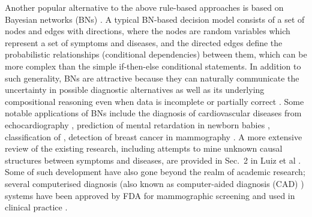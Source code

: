 Another popular alternative to the above rule-based approaches is based on Bayesian networks (BNs) \cite{pearl2014probabilistic}. A typical BN-based decision model consists of a set of nodes and edges with directions, where the nodes are random variables which represent a set of symptoms and diseases, and the directed edges define the probabilistic relationships (conditional dependencies) between them, which can be more complex than the simple if-then-else conditional statements. In addition to such generality, BNs are attractive because they can naturally communicate the uncertainty in possible diagnostic alternatives as well as its underlying compositional reasoning even when data is incomplete or partially correct \cite{nikovski2000constructing}. Some notable applications of BNs include the diagnosis of cardiovascular diseases from echocardiography \cite{diez1997diaval}, prediction of mental retardation in newborn babies \cite{mani1997mentor}, classification of ,  detection of breast cancer in mammography \cite{kahn1997construction,sajda2003multi,burnside2004probabilistic}. A more extensive review of the existing research, including attempts to mine unknown causal structures between symptoms and diseases, are provided in Sec.~2 in Luiz et al \cite{seixas2014bayesian}. Some of such development have also gone beyond the realm of academic research; several computerised diagnosis (also known as computer-aided diagnosis (CAD) \cite{doi1993digital}) systems have been approved by FDA for mammographic screening  and used in clinical practice \cite{sajda2006machine}. 




